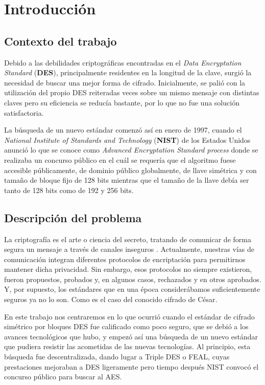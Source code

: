 \chapter{Introducción}
\label{chp:intro}
\section{Contexto del trabajo}
Debido a las debilidades criptográficas encontradas en el \textit{Data Encryptation Standard} (\textbf{DES}), principalmente residentes en la longitud de la clave, surgió la necesidad de buscar una mejor forma de cifrado. Inicialmente, se palió con la utilización del propio DES reiteradas veces sobre un mismo mensaje con distintas claves pero su eficiencia se reducía bastante, por lo que no fue una solución satisfactoria.

La búsqueda de un nuevo estándar comenzó así en enero de 1997, cuando el \textit{National Institute of Standards and Technology} (\textbf{NIST}) de los Estados Unidos anunció lo que se conoce como \textit{Advanced Encryptation Standard process} donde se realizaba un concurso público en el cuál se requería que el algoritmo fuese accesible públicamente, de dominio público globalmente, de llave simétrica y con tamaño de bloque fijo de 128 bits mientras que el tamaño de la llave debía ser tanto de 128 bits como de 192 y 256 bits.


\section{Descripción del problema}

La criptografía es el arte o ciencia del secreto, tratando de comunicar de forma segura un mensaje a través de canales inseguros \cite{Art_of_Secrecy}. Actualmente, nuestras vías de comunicación integran diferentes protocolos de encriptación para permitirnos mantener dicha privacidad. Sin embargo, esos protocolos no siempre existieron, fueron propuestos, probados y, en algunos casos, rechazados y en otros aprobados. Y, por supuesto, los estándares que en una época considerábamos suficientemente seguros ya no lo son. Como es el caso del conocido cifrado de César.

En este trabajo nos centraremos en lo que ocurrió cuando el estándar de cifrado simétrico por bloques DES fue calificado como poco seguro, que se debió a los avances tecnológicos que hubo, y empezó así una búsqueda de un nuevo estándar que pudiera resistir las acometidas de las nuevas tecnologías. Al principio, esta búsqueda fue descentralizada, dando lugar a Triple DES o FEAL, cuyas prestaciones mejoraban a DES ligeramente pero tiempo después NIST convocó el concurso público para buscar al AES.

